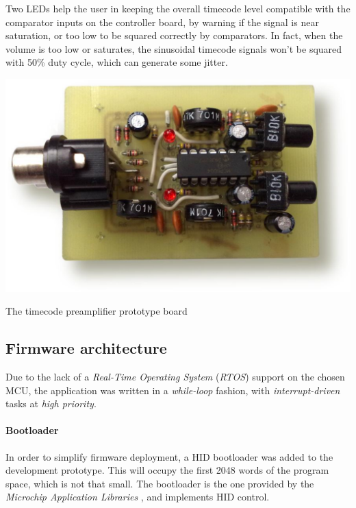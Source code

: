 \documentclass[a4paper,10pt]{article}
\makeatletter
\newenvironment{figurehere}{\def\@captype{figure}\vspace{2ex}}{\vspace{2ex}}
\makeatother
\begin{document}
\begin{multicols}{2}
Two LEDs help the user in keeping the overall timecode level compatible with
the comparator inputs on the controller board, by warning if the signal is
near saturation, or too low to be squared correctly by comparators.
In fact, when the volume is too low or saturates, the sinusoidal timecode
signals won't be squared with 50\% duty cycle, which can generate some jitter.

\begin{figurehere}
	\centering
	\includegraphics[keepaspectratio=true,width=\columnwidth]{images/preamp_photo.pdf}
	\caption{The timecode preamplifier prototype board}
	\label{fig:preamp_photo}
\end{figurehere}


\subsection{Firmware architecture}

Due to the lack of a \emph{Real-Time Operating System} (\emph{RTOS}) support
on the chosen MCU, the application was written in a \emph{while-loop} fashion,
with \emph{interrupt-driven} tasks at \emph{high priority}.


\paragraph{Bootloader}
In order to simplify firmware deployment, a HID bootloader was added to the
development prototype. This will occupy the first 2048 words of the program
space, which is not that small. The bootloader is the one provided by the
\emph{Microchip Application Libraries} \cite{microchip_mal}, and implements
HID control.


\end{multicols}
\end{document}
